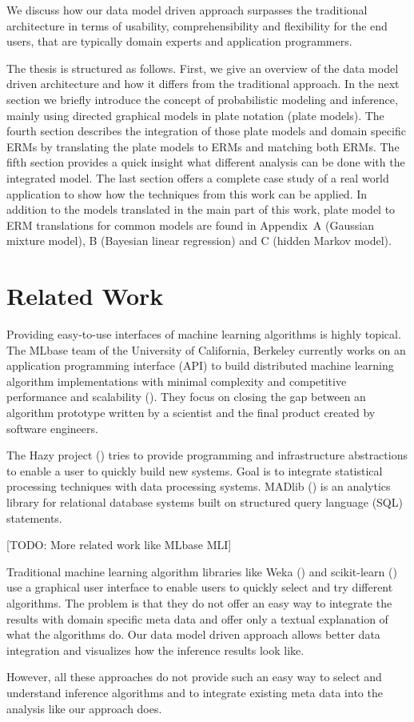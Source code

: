 We discuss how our data model driven approach surpasses the traditional architecture in terms of usability, comprehensibility and flexibility for the end users, that are typically domain experts and application programmers.

The thesis is structured as follows. First, we give an overview of the data model driven architecture and how it differs from the traditional approach. In the next section we briefly introduce the concept of probabilistic modeling and inference, mainly using directed graphical models in plate notation (plate models). The fourth section describes the integration of those plate models and domain specific ERMs by translating the plate models to ERMs and matching both ERMs. The fifth section provides a quick insight what different analysis can be done with the integrated model. The last section offers a complete case study of a real world application to show how the techniques from this work can be applied. In addition to the models translated in the main part of this work, plate model to ERM translations for common models are found in Appendix~A (Gaussian mixture model), B (Bayesian linear regression) and C (hidden Markov model).

\newpage

\section{Related Work}

Providing easy-to-use interfaces of machine learning algorithms is highly topical. The MLbase team of the University of California, Berkeley currently works on an application programming interface (API) to build distributed machine learning algorithm implementations with minimal complexity and competitive performance and scalability (\cite{sparks2013mli}). They focus on closing the gap between an algorithm prototype written by a scientist and the final product created by software engineers.

The Hazy project (\cite{kumar2013hazy}) tries to provide programming and infrastructure abstractions to enable a user to quickly build new systems. Goal is to integrate statistical processing techniques with data processing systems. MADlib (\cite{hellerstein2012madlib}) is an analytics library for relational database systems built on structured query language (SQL) statements.

[TODO: More related work like MLbase MLI]

Traditional machine learning algorithm libraries like Weka (\cite{hall2009weka}) and scikit-learn (\cite{scikit-learn}) use a graphical user interface to enable users to quickly select and try different algorithms. The problem is that they do not offer an easy way to integrate the results with domain specific meta data and offer only a textual explanation of what the algorithms do. Our data model driven approach allows better data integration and visualizes how the inference results look like.

However, all these approaches do not provide such an easy way to select and understand inference algorithms and to integrate existing meta data into the analysis like our approach does.
